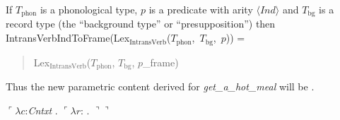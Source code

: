 \begin{ex}
  If $T_{\mathrm{phon}}$ is a phonological type, $p$ is a predicate with
arity $\langle\textit{Ind}\rangle$ and
$T_\mathrm{bg}$ is a record type (the ``background type'' or
``presupposition'') then \\ 
\mbox{IntransVerbIndToFrame(Lex$_{\mathrm{IntransVerb}}$($T_{\mathrm{phon}}$,
  $T_\mathrm{bg}$, $p$))} =
\begin{quote}
  Lex$_{\mathrm{IntransVerb}}$($T_{\mathrm{phon}}$,
  $T_\mathrm{bg}$, $p$\_frame)
\end{quote}
\label{ex:IntransVerbIndToFrame} 
\end{ex} 
Thus the new parametric content derived for
\textit{get\_a\_hot\_meal} will be \nexteg{}.
\begin{ex} 
$\ulcorner\lambda c$:\textit{Cntxt} . $\ulcorner\lambda r$: . 
                 $\urcorner\urcorner$
\label{ex:contgetahotmealframe}  
\end{ex}

